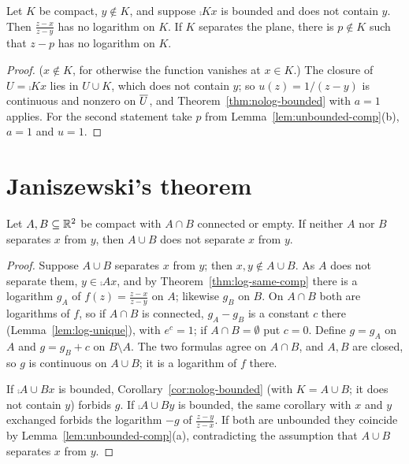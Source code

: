 
\begin{corollary}\label{cor:nolog-bounded}
Let $K$ be compact, $y\notin K$, and suppose $\comp Kx$ is bounded and does not contain $y$. Then
$\frac{z-x}{z-y}$ has no logarithm on $K$. If $K$ separates the plane, there is $p\notin K$ such that
$z-p$ has no logarithm on $K$.
\end{corollary}

\begin{proof}
($x\notin K$, for otherwise the function vanishes at $x\in K$.) The closure of $U=\comp Kx$ lies in
$U\cup K$, which does not contain $y$; so $u(z)=1/(z-y)$ is continuous and nonzero on $\overline{U}$, and
Theorem~\ref{thm:nolog-bounded} with $a=1$ applies. For the second statement take $p$ from
Lemma~\ref{lem:unbounded-comp}(b), $a=1$ and $u=1$.
\end{proof}


\section{Janiszewski's theorem}

\begin{theorem}[Janiszewski]\label{thm:janiszewski}
Let $A,B\subseteq\mathbb{R}^2$ be compact with $A\cap B$ connected or empty. If neither $A$ nor $B$
separates $x$ from $y$, then $A\cup B$ does not separate $x$ from $y$.
\end{theorem}

\begin{proof}
Suppose $A\cup B$ separates $x$ from $y$; then $x,y\notin A\cup B$. As $A$ does not separate them,
$y\in\comp Ax$, and by Theorem~\ref{thm:log-same-comp} there is a logarithm $g_A$ of
$f(z)=\frac{z-x}{z-y}$ on $A$; likewise $g_B$ on $B$. On $A\cap B$ both are logarithms of $f$, so
if $A\cap B$ is connected, $g_A-g_B$ is a constant $c$ there (Lemma~\ref{lem:log-unique}), with
$e^c=1$; if $A\cap B=\emptyset$ put $c=0$. Define $g=g_A$ on $A$ and $g=g_B+c$ on $B\setminus A$.
The two formulas agree on $A\cap B$, and $A,B$ are closed, so $g$ is continuous on $A\cup B$; it is a
logarithm of $f$ there.

If $\comp{A\cup B}x$ is bounded, Corollary~\ref{cor:nolog-bounded} (with $K=A\cup B$; it does not
contain $y$) forbids $g$. If $\comp{A\cup B}y$ is bounded, the same corollary with $x$ and $y$
exchanged forbids the logarithm $-g$ of $\frac{z-y}{z-x}$. If both are unbounded they coincide by
Lemma~\ref{lem:unbounded-comp}(a), contradicting the assumption that $A\cup B$ separates $x$ from
$y$.
\end{proof}

